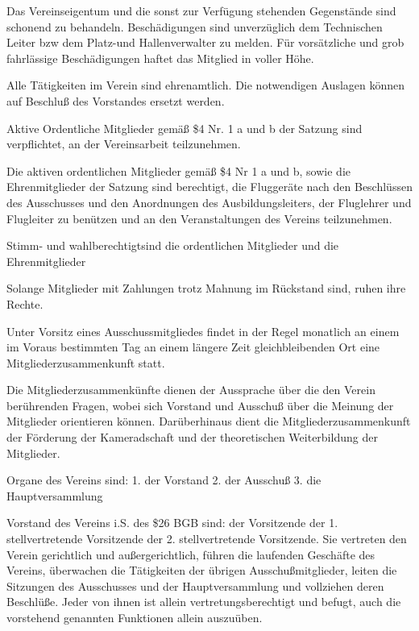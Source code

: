 \documentclass[11pt,a4paper,parskip=half]{scrartcl}
\begin{document}
\begin{contract}
\begin{multicols}{2}
		Das Vereinseigentum und die sonst zur
		Verfügung stehenden Gegenstände sind schonend
		zu behandeln. Beschädigungen sind unverzüglich
		dem Technischen Leiter bzw dem Platz-und
		Hallenverwalter zu melden.
		Für vorsätzliche und grob fahrlässige
		Beschädigungen haftet das Mitglied in voller
		Höhe.
		
		Alle Tätigkeiten im Verein sind ehrenamtlich. Die
		notwendigen Auslagen können auf Beschluß
		des Vorstandes ersetzt werden.
		
		Aktive Ordentliche Mitglieder gemäß \$4 Nr. 1 a
		und b der Satzung sind verpflichtet, an der
		Vereinsarbeit teilzunehmen.
		
			
		Die aktiven ordentlichen
		Mitglieder gemäß \$4 Nr 1 a und b, sowie die
		Ehrenmitglieder der Satzung sind berechtigt, die
		Fluggeräte nach den Beschlüssen des Ausschusses
		und den Anordnungen des Ausbildungsleiters, der
		Fluglehrer und Flugleiter zu benützen und an den
		Veranstaltungen des Vereins teilzunehmen.
		
		Stimm- und wahlberechtigtsind die
		ordentlichen Mitglieder und die Ehrenmitglieder
		
		Solange Mitglieder mit Zahlungen trotz
		Mahnung im Rückstand sind, ruhen ihre
		Rechte.
		
		Unter Vorsitz eines Ausschussmitgliedes findet
		in	der Regel monatlich an einem im Voraus
		bestimmten Tag an einem längere Zeit
		gleichbleibenden Ort eine
		Mitgliederzusammenkunft statt.
		
		Die Mitgliederzusammenkünfte dienen der
		Aussprache über die den Verein berührenden
		Fragen, wobei sich Vorstand und Ausschuß über
		die Meinung der Mitglieder orientieren können.
		Darüberhinaus dient die Mitgliederzusammenkunft
		der Förderung der Kameradschaft und der
		theoretischen Weiterbildung der Mitglieder.
		
		Organe des Vereins sind:
		1. der Vorstand
		2. der Ausschuß
		3. die Hauptversammlung
		
		Vorstand des Vereins i.S. des \$26 BGB sind:
		der Vorsitzende
		der 1. stellvertretende Vorsitzende
		der 2. stellvertretende Vorsitzende.
		Sie vertreten den Verein gerichtlich und
		außergerichtlich, führen die laufenden Geschäfte
		des Vereins, überwachen die Tätigkeiten der
		übrigen Ausschußmitglieder, leiten die Sitzungen
		des Ausschusses und der Hauptversammlung und
		vollziehen deren Beschlüße. Jeder von ihnen ist
		allein vertretungsberechtigt und befugt, auch die
		vorstehend genannten Funktionen allein
		auszuüben.
		

\end{multicols}
\end{contract}
\end{document}
